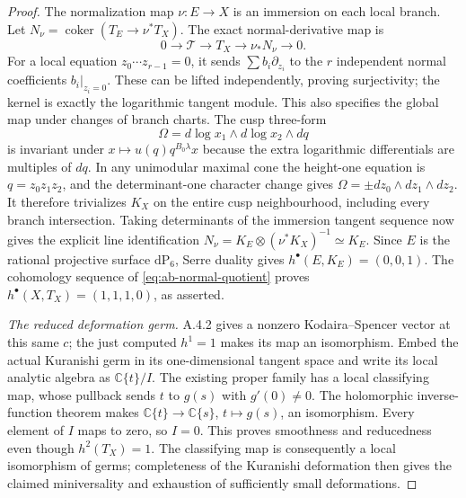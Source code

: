 \begin{proof}
The normalization map $\nu:E\to X$ is an immersion on each local
branch. Let $N_\nu=\operatorname{coker}(T_E\to\nu^*T_X)$.
The exact normal-derivative map is
\begin{equation}\label{eq:ab-normal-quotient}
 0\longrightarrow\mathcal T\longrightarrow T_X
 \longrightarrow\nu_*N_\nu\longrightarrow0.
\end{equation}
For a local equation $z_0\cdots z_{r-1}=0$, it sends
$\sum b_i\partial_{z_i}$ to the $r$ independent normal coefficients
$b_i|_{z_i=0}$. These can be lifted independently, proving
surjectivity; the kernel is exactly the logarithmic tangent module.
This also specifies the global map under changes of branch charts.
The cusp three-form
\[
 \Omega=d\log x_1\wedge d\log x_2\wedge dq
\]
is invariant under $x\mapsto u(q)q^{B_0\lambda}x$ because the
extra logarithmic differentials are multiples of $dq$. In any
unimodular maximal cone the height-one equation is $q=z_0z_1z_2$,
and the determinant-one character change gives
$\Omega=\pm dz_0\wedge dz_1\wedge dz_2$.
It therefore trivializes $K_X$ on the entire cusp neighbourhood,
including every branch intersection. Taking determinants of the
immersion tangent sequence now gives the explicit line identification
$N_\nu=K_E\otimes(\nu^*K_X)^{-1}\simeq K_E$.
Since $E$ is the rational projective surface $\mathrm{dP}_6$,
Serre duality gives $h^\bullet(E,K_E)=(0,0,1)$.
The cohomology sequence of \eqref{eq:ab-normal-quotient} proves
$h^\bullet(X,T_X)=(1,1,1,0)$, as asserted.

\emph{The reduced deformation germ.}
A.4.2 gives a nonzero Kodaira--Spencer vector at this same $c$;
the just computed $h^1=1$ makes its map an isomorphism.
Embed the actual Kuranishi germ in its one-dimensional tangent space
and write its local analytic algebra as $\mathbb C\{t\}/I$.
The existing proper family has a local classifying map, whose pullback
sends $t$ to $g(s)$ with $g'(0)\ne0$. The holomorphic inverse-function
theorem makes $\mathbb C\{t\}\to\mathbb C\{s\}$, $t\mapsto g(s)$,
an isomorphism. Every element of $I$ maps to zero, so $I=0$.
This proves smoothness and reducedness even though $h^2(T_X)=1$.
The classifying map is consequently a local isomorphism of germs;
completeness of the Kuranishi deformation then gives the claimed
miniversality and exhaustion of sufficiently small deformations.
\end{proof}

